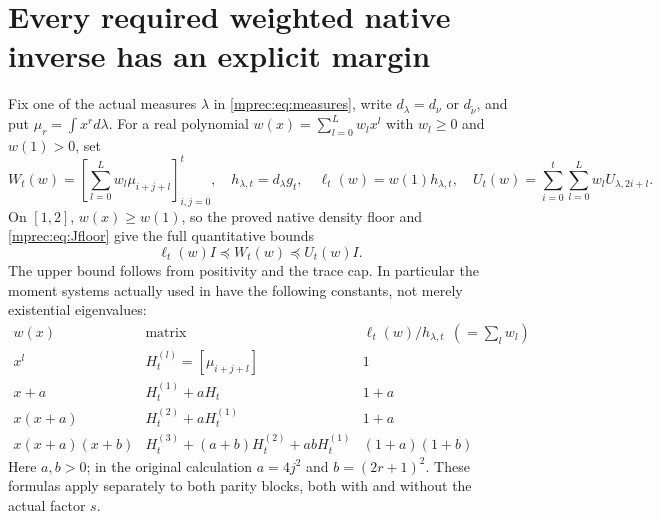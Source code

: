 \documentclass[11pt]{article}
\begin{document}
\section{Every required weighted native inverse has an explicit margin}

Fix one of the actual measures $\lambda$ in \eqref{mprec:eq:measures},
write $d_\lambda=d_\nu$ or $d_{\widetilde\nu}$, and put
$\mu_r=\int x^r d\lambda$. For a real polynomial
$w(x)=\sum_{l=0}^Lw_lx^l$ with $w_l\ge0$ and $w(1)>0$, set
\begin{equation}\label{mprec:eq:W}
 W_t(w)=\left[\sum_{l=0}^Lw_l\mu_{i+j+l}\right]_{i,j=0}^t,
 \quad h_{\lambda,t}=d_\lambda g_t,
 \quad \ell_t(w)=w(1)h_{\lambda,t},\quad
 U_t(w)=\sum_{i=0}^t\sum_{l=0}^Lw_lU_{\lambda,2i+l}.
\end{equation}
On $[1,2]$, $w(x)\ge w(1)$, so the proved native density floor
and \eqref{mprec:eq:Jfloor} give the full quantitative bounds
\begin{equation}\label{mprec:eq:Wfloor}
 \boxed{\ell_t(w)I\preceq W_t(w)\preceq U_t(w)I.}
\end{equation}
The upper bound follows from positivity and the trace cap. In
particular the moment systems actually used in \cite{mprec:FM} have
the following constants, not merely existential eigenvalues:
\[
\begin{array}{c|c|c}
 w(x)&\text{matrix}&\ell_t(w)/h_{\lambda,t}\ \ (=\sum_lw_l)\\ \hline
 x^l&H_t^{(l)}=[\mu_{i+j+l}]&1\\
 x+a&H_t^{(1)}+aH_t&1+a\\
 x(x+a)&H_t^{(2)}+aH_t^{(1)}&1+a\\
 x(x+a)(x+b)&H_t^{(3)}+(a+b)H_t^{(2)}+abH_t^{(1)}&(1+a)(1+b)
\end{array}
\]
Here $a,b>0$; in the original calculation $a=4j^2$ and
$b=(2r+1)^2$. These formulas apply separately to both parity
blocks, both with and without the actual factor $s$.
\end{document}
